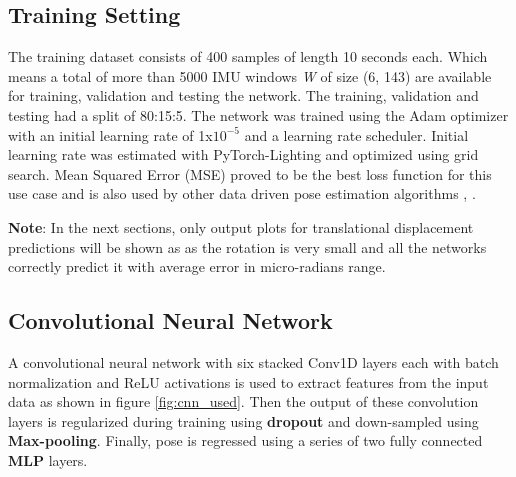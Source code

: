 \subsection{Training Setting}
The training dataset consists of 400 samples of length 10 seconds each. Which means a total of more than 5000 IMU windows \textit{W} of size (6, 143) are available for training, validation and testing the network. The training, validation and testing had a split of 80:15:5. The network was trained using the Adam optimizer with an initial learning rate of 1x$ 10^{-5} $ and a learning rate scheduler. Initial learning rate was estimated with PyTorch-Lighting and optimized using grid search. Mean Squared Error (MSE) proved to be the best loss function for this use case and is also used by other data driven pose estimation algorithms \citep{yan2018ridi}, \citep{herath2020ronin}.

\textbf{Note}: In the next sections, only output plots for translational displacement predictions will be shown as as the rotation is very small and all the networks correctly predict it with average error in micro-radians range.

\subsection{Convolutional Neural Network}
A convolutional neural network with six stacked Conv1D layers each with batch normalization and ReLU activations is used to extract features from the input data as shown in figure \ref{fig:cnn_used}. Then the output of these convolution layers is regularized during training using \textbf{dropout} and down-sampled using \textbf{Max-pooling}. Finally, pose is regressed using a series of two fully connected \textbf{MLP} layers.

